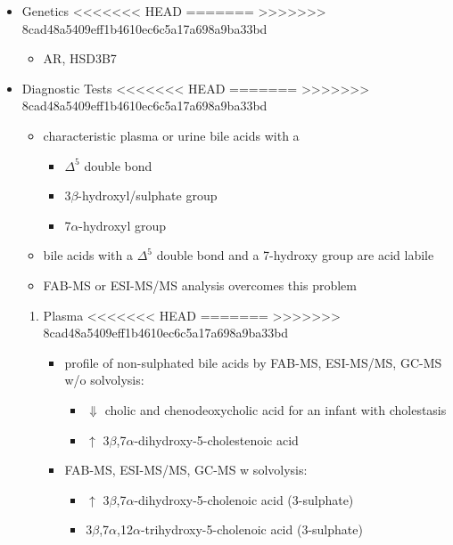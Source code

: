 \documentclass{scrartcl}
\begin{document}
\begin{itemize}
\begin{enumerate}
\begin{enumerate}
\begin{enumerate}
\begin{enumerate}
\begin{itemize}
\item Genetics
<<<<<<< HEAD
\label{sec:org5148b2b}
=======
\label{sec:org5ed390b}
>>>>>>> 8cad48a5409eff1b4610ec6c5a17a698a9ba33bd
\begin{itemize}
\item AR, HSD3B7
\end{itemize}

\item Diagnostic Tests
<<<<<<< HEAD
\label{sec:org077a7f8}
=======
\label{sec:orgccf155b}
>>>>>>> 8cad48a5409eff1b4610ec6c5a17a698a9ba33bd
\begin{itemize}
\item characteristic plasma or urine bile acids with a
\begin{itemize}
\item \(\Delta^{\text{5}}\) double bond
\item 3\(\beta\)-hydroxyl/sulphate group
\item 7\(\alpha\)-hydroxyl group
\end{itemize}
\item bile acids with a \(\Delta^{\text{5}}\) double bond and a 7-hydroxy group are acid labile
\item FAB-MS or ESI-MS/MS analysis overcomes this problem
\end{itemize}

\begin{enumerate}
\item Plasma
<<<<<<< HEAD
\label{sec:org457b65c}
=======
\label{sec:orgc176533}
>>>>>>> 8cad48a5409eff1b4610ec6c5a17a698a9ba33bd
\begin{itemize}
\item profile of non-sulphated bile acids by FAB-MS, ESI-MS/MS, GC-MS w/o solvolysis:
\begin{itemize}
\item \(\Downarrow\) cholic and chenodeoxycholic acid for an infant with cholestasis
\item \(\uparrow\) 3\(\beta\),7\(\alpha\)-dihydroxy-5-cholestenoic acid
\end{itemize}
\item FAB-MS, ESI-MS/MS, GC-MS w solvolysis:
\begin{itemize}
\item \(\uparrow\) 3\(\beta\),7\(\alpha\)-dihydroxy-5-cholenoic acid (3-sulphate)
\item 3\(\beta\),7\(\alpha\),12\(\alpha\)-trihydroxy-5-cholenoic acid (3-sulphate)
\end{itemize}
\end{itemize}


\end{enumerate}
\end{itemize}
\end{enumerate}
\end{enumerate}
\end{enumerate}
\end{enumerate}
\end{itemize}
\end{document}
